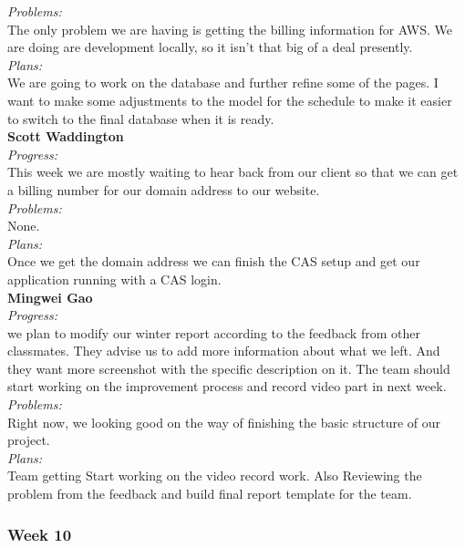 \noindent\textit{Problems:}\\
\noindent The only problem we are having is getting the billing information for AWS. We are doing are development locally, so it isn't that big of a deal presently.\\

\noindent\textit{Plans:}\\
\noindent We are going to work on the database and further refine some of the pages. I want to make some adjustments to the model for the schedule to make it easier to switch to the final database when it is ready.\\

\noindent\textbf{Scott Waddington}\\
\noindent\textit{Progress:}\\
This week we are mostly waiting to hear back from our client so that we can get a billing number for our domain address to our website.\\

\noindent\textit{Problems:}\\
\noindent None.\\

\noindent\textit{Plans:}\\
\noindent Once we get the domain address we can finish the CAS setup and get our application running with a CAS login.\\

\noindent\textbf{Mingwei Gao}\\
\noindent\textit{Progress:}\\
 we plan to modify our winter report according to the feedback from other classmates. They advise us to add more information about what we left. And they want more screenshot with the specific description on it. The team should start working on the improvement process and record video part in next week.\\

\noindent\textit{Problems:}\\
\noindent Right now, we looking good on the way of finishing the basic structure of our project. \\

\noindent\textit{Plans:}\\
\noindent  Team getting Start working on the video record work. Also Reviewing the problem from the feedback and build final report template for the team.\\

\subsubsection{Week 10}

